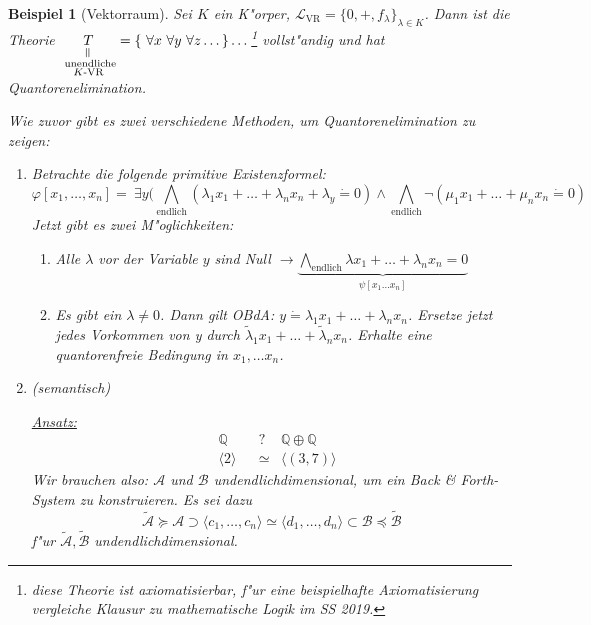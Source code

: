 \documentclass[a4paper,12pt,numbers=noenddot,parskip=full]{scrartcl}
\newcommand{\setQ}{\mathbb{Q}}
\newcommand{\Forall}{~\forall}
\newcommand{\Exists}{~\exists}
\newcommand{\scrL}{\mathcal{L}}
\newcommand{\scrA}{\mathcal{A}}
\newcommand{\scrB}{\mathcal{B}}
\theoremstyle{dotless}
\newtheorem{example}[theorem]{Beispiel}
\begin{document}
\begin{example}[Vektorraum]
	Sei $K$ ein K"orper, $\scrL_\text{VR} = \{0, +, f_\lambda \}_{\lambda \in K}$. Dann ist die Theorie $\underset{\substack{\rotatebox{90}{$=$} \\ \text{ unendliche}\\ K\text{-VR}}}{T} = \{\Forall x \Forall y \Forall z \dots \} \dots$\footnote{diese Theorie ist axiomatisierbar, f"ur eine beispielhafte Axiomatisierung vergleiche Klausur zu mathematische Logik im SS 2019.} vollst"andig und hat Quantorenelimination.
	
	Wie zuvor gibt es zwei verschiedene Methoden, um Quantorenelimination zu zeigen:
	\begin{enumerate}
		\item Betrachte die folgende primitive Existenzformel: 
		\begin{equation*}
			\varphi[x_1, \dots, x_n] = \Exists y (\bigwedge\limits_{\text{endlich}} (\lambda_1 x_1 + \dots + \lambda_n x_n + \lambda_y \dot= 0) \land \bigwedge\limits_{\text{endlich}} \lnot (\mu_1 x_1 + \dots + \mu_n x_n \dot= 0)
		\end{equation*}
		Jetzt gibt es zwei M"oglichkeiten:
		\begin{enumerate}
			\item \emph{Alle $\lambda$ vor der Variable $y$ sind Null} $\rightarrow \underbrace{\bigwedge\limits_{\text{endlich}} \lambda x_1 + \dots + \lambda_n x_n = 0}_{\psi[x_1 \dots x_n]}$
			
			\item \emph{Es gibt ein $\lambda \neq 0$}. Dann gilt OBdA: $y \dot= \lambda_1 x_1 + \dots + \lambda_n x_n$. Ersetze jetzt jedes Vorkommen von y durch $\tilde{\lambda}_1 x_1 + \dots + \tilde{\lambda}_n x_n$. Erhalte eine quantorenfreie Bedingung in $x_1, \dots x_n$.
		\end{enumerate}
		
		\item (semantisch)
		
		\underline{Ansatz:} \begin{align*}
			&\setQ &&? &\setQ \oplus \setQ \\
			&\langle 2 \rangle &&\simeq &\langle (3,7) \rangle
		\end{align*}
		Wir brauchen also: $\scrA$ und $\scrB$ undendlichdimensional, um ein Back \& Forth-System zu konstruieren. Es sei dazu
		\begin{equation*}
			\tilde{\scrA} \succeq \scrA \supset \langle c_1, \dots, c_n \rangle \simeq \langle d_1, \dots , d_n \rangle \subset \scrB \preceq \tilde{\scrB}
		\end{equation*}
		f"ur $\tilde{\scrA}, \tilde{\scrB}$ undendlichdimensional.
		

\end{enumerate}
\end{example}
\end{document}

